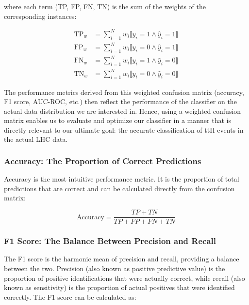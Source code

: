 where each term (TP, FP, FN, TN) is the sum of the weights of the corresponding instances:

\begin{align}
    \text{TP}_{w} & = \sum_{i=1}^{N} w_i \llbracket y_i = 1 \land \hat{y}_i = 1 \rrbracket \\
    \text{FP}_{w} & = \sum_{i=1}^{N} w_i \llbracket y_i = 0 \land \hat{y}_i = 1 \rrbracket \\
    \text{FN}_{w} & = \sum_{i=1}^{N} w_i \llbracket y_i = 1 \land \hat{y}_i = 0 \rrbracket \\
    \text{TN}_{w} & = \sum_{i=1}^{N} w_i \llbracket y_i = 0 \land \hat{y}_i = 0 \rrbracket
\end{align}


The performance metrics derived from this weighted confusion matrix (accuracy, F1 score, AUC-ROC, etc.) then reflect the
performance of the classifier on the actual data distribution we are interested in. Hence, using a weighted confusion
matrix enables us to evaluate and optimize our classifier in a manner that is directly relevant to our ultimate goal:
the accurate classification of ttH events in the actual LHC data.

\subsubsection{Accuracy: The Proportion of Correct Predictions}

Accuracy is the most intuitive performance metric. It is the proportion of total predictions that are correct and can be
calculated directly from the confusion matrix:

\begin{equation}
    \text{Accuracy} = \frac{TP + TN}{TP + FP + FN + TN}
\end{equation}

\subsubsection{F1 Score: The Balance Between Precision and Recall}


The F1 score is the harmonic mean of precision and recall, providing a balance between the two. Precision (also known as
positive predictive value) is the proportion of positive identifications that were actually correct, while recall (also
known as sensitivity) is the proportion of actual positives that were identified correctly. The F1 score can be
calculated as:

